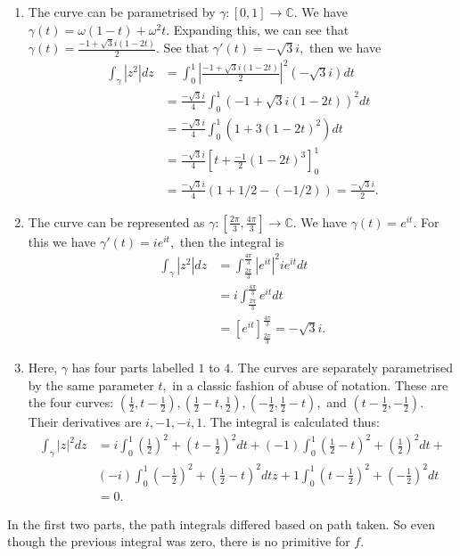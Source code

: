 \documentclass{article}
\begin{document}
\section{} %
\begin{enumerate}
	\item The curve can be parametrised by $\gamma: [0,1] \to \mathbb{C}.$ We have $\gamma(t)=\omega( 1-t) +\omega^2 t.$ Expanding this, we can see that 
	$\gamma(t)= \frac{-1+ \sqrt{3}i(1-2t)}{2}.$ See that $\gamma'(t)=-\sqrt{3}i,$ then we have 
	\begin{align*}
		\int_{\gamma}|z^2|dz &= \int_{0}^{1}\left|\frac{-1+ \sqrt{3}i(1-2t)}{2}\right|^2  (-\sqrt{3}i)dt\\
		&= \frac{-\sqrt{3}i}{4}\int_{0}^1 (-1+ \sqrt{3}i(1-2t))^2dt\\
		&= \frac{-\sqrt{3}i}{4}\int_{0}^1  \left( 1 + 3 (1-2t)^2 \right) dt\\
		&= \frac{-\sqrt{3}i}{4}\left[t +  \frac{-1}{2}(1-2t)^{3} \right]^1_0\\
		&= \frac{-\sqrt{3}i}{4} (1+ 1/2 - (- 1/2))= \frac{-\sqrt{3}i}{2}.
	\end{align*}
	\item The curve can be represented as $\gamma:\left[\frac{2\pi}{3},\frac{4\pi}{3}\right] \to \mathbb{C}.$ We have $\gamma(t)= e^{it}.$ For this we have 
	$\gamma'(t)=ie^{it},$ then the integral is 
	\begin{align*}
		\int_{\gamma}|z^2|dz &= \int_{\frac{2\pi}{3}}^{\frac{4\pi}{3}}|e^{it}|^2ie^{it}dt\\
		&= i\int_{\frac{2\pi}{3}}^{\frac{4\pi}{3}}e^{it}dt\\
		&= \left[e^{it}\right]^{\frac{4\pi}{3}}_{\frac{2\pi}{3}}= -\sqrt{3}i.
	\end{align*} 
	\item Here, $\gamma$ has four parts labelled $1$ to $4.$ The curves are separately parametrised by the same parameter $t,$ in a classic fashion of abuse 
	of notation. These are the four curves: $\left(\frac{1}{2},t-\frac{1}{2}\right), \left(\frac{1}{2}-t,\frac{1}{2}\right), 
	\left(-\frac{1}{2},\frac{1}{2}-t\right),$ and $\left(t-\frac{1}{2},-\frac{1}{2}\right).$ Their derivatives are $i, -1, -i, 1.$ The integral is 
	calculated thus:
	\begin{align*}
		\int_{\gamma}|z|^2dz &= i\int_{0}^1 \left(\frac{1}{2}\right)^2+\left(t-\frac{1}{2}\right)^2dt+ (-1)\int_{0}^1 
		\left(\frac{1}{2}-t\right)^2+\left(\frac{1}{2}\right)^2dt+\\
		&(-i)\int_{0}^1 \left(-\frac{1}{2}\right)^2+\left(\frac{1}{2}-t\right)^2dtz+ 1\int_{0}^1 \left(t-\frac{1}{2}\right)^2+\left(-\frac{1}{2}\right)^2dt\\
		&= 0. 
	\end{align*}
\end{enumerate}
In the first two parts, the path integrals differed based on path taken. So even though the previous integral was zero, there is no primitive for $f.$
\end{document}
